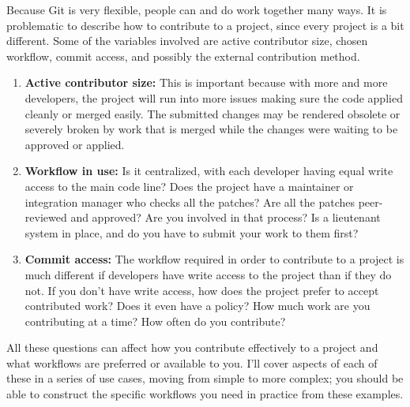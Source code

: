 \documentclass[draftclsnofoot,journal,onecolumn,12pt]{IEEEtran}
\begin{document}
Because Git is very flexible, people can and do work together many ways. It is problematic to describe how to contribute to a project, since every project is a bit different. Some of the variables involved are active contributor size, chosen workflow, commit access, and possibly the external contribution method.
\begin{enumerate}
  \item \textbf{Active contributor size:} This is important because with more and more developers, the project will run into more issues making sure the code applied cleanly or merged easily. The submitted changes may be rendered obsolete or severely broken by work that is merged while the changes were waiting to be approved or applied.
  \item \textbf{Workflow in use:} Is it centralized, with each developer having equal write access to the main code line? Does the project have a maintainer or integration manager who checks all the patches? Are all the patches peer-reviewed and approved? Are you involved in that process? Is a lieutenant system in place, and do you have to submit your work to them first?
  \item \textbf{Commit access:} The workflow required in order to contribute to a project is much different if developers have write access to the project than if they do not. If you don’t have write access, how does the project prefer to accept contributed work? Does it even have a policy? How much work are you contributing at a time? How often do you contribute?
\end{enumerate}

All these questions can affect how you contribute effectively to a project and what workflows are preferred or available to you. I’ll cover aspects of each of these in a series of use cases, moving from simple to more complex; you should be able to construct the specific workflows you need in practice from these examples.
\end{document}
